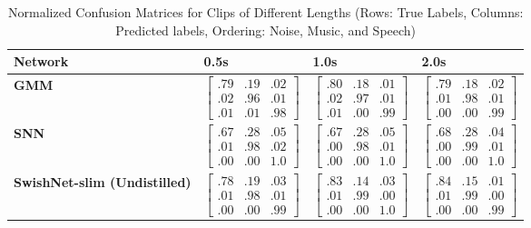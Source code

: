



\begin{table}
	\centering
	\caption{Normalized Confusion Matrices for Clips of Different Lengths (Rows: True Labels, Columns: Predicted labels, Ordering: Noise, Music, and Speech)}
	\begin{tabular}{M{5.4em}P{6.5em}P{6.5em}P{6.5em}} 
		
		\toprule
		\textbf{Network} & \textbf{0.5s} & \textbf{1.0s} & \textbf{2.0s} \\
		
		\midrule[1pt] 
		\textbf{GMM} 
		& $\begin{bmatrix}
		.79 & .19 & .02\\
		.02 & .96 & .01\\
		.01 & .01 & .98
		\end{bmatrix} $
		& $\begin{bmatrix}
		.80 & .18 & .01\\
		.02 & .97 & .01\\
		.01 & .00 & .99
		\end{bmatrix}$
		& $\begin{bmatrix}
		.79 & .18 & .02\\
		.01 & .98 & .01\\
		.00 & .00 & .99
		\end{bmatrix}$ \\
		
		\midrule
		\textbf{SNN} 
		& $\begin{bmatrix}
		.67 & .28 & .05\\
		.01 & .98 & .02\\
		.00 & .00 & 1.0
		\end{bmatrix} $
		& $\begin{bmatrix}
		.67 & .28 & .05\\
		.00 & .98 & .01\\
		.00 & .00 & 1.0
		\end{bmatrix}$
		& $\begin{bmatrix}
		.68 & .28 & .04\\
		.00 & .99 & .01\\
		.00 & .00 & 1.0
		\end{bmatrix}$ \\
		
		\midrule
		\textbf{SwishNet-slim (Undistilled)}
		& $\begin{bmatrix}
		.78 & .19 & .03\\
		.01 & .98 & .01\\
		.00 & .00 & .99
		\end{bmatrix}$ 
		& $\begin{bmatrix}
		.83 & .14 & .03\\
		.01 & .99 & .00\\
		.00 & .00 & 1.0
		\end{bmatrix}$
		& $\begin{bmatrix}
		.84 & .15 & .01\\
		.01 & .99 & .00\\
		.00 & .00 & .99
		\end{bmatrix}$\\
		

\end{tabular}
\end{table}
